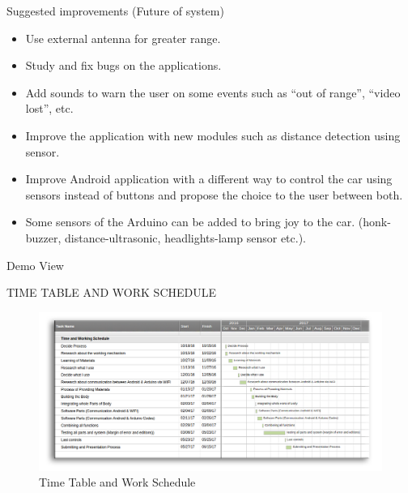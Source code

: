 \documentclass[xcolor=table, 9pt]{beamer}
\begin{document}
\begin{frame}{Suggested improvements (Future of system)}
\begin{itemize}
\item Use external antenna for greater range.
\vspace{0.1cm}
\item Study and fix bugs on the applications.
\vspace{0.1cm}
\item Add sounds to warn the user on some events such as “out of range”, “video lost”, etc.
\vspace{0.1cm}
\item Improve the application with new modules such as distance detection using sensor.
\vspace{0.1cm}
\item Improve Android application with a different way to control the car using sensors instead of buttons and propose the choice to the user between both.
\vspace{0.1cm}
\item Some sensors of the Arduino can be added to bring joy to the car. (honk-buzzer, distance-ultrasonic, headlights-lamp sensor etc.).
\end{itemize}

\end{frame}




\begin{frame}{Demo View}
\begin{center}
\end{center}
\end{frame}



\begin{frame}{TIME TABLE AND WORK SCHEDULE}
\begin{figure}
\includegraphics[width=1\linewidth]{ganttChart.png}
\caption{Time Table and Work Schedule}
\end{figure}
\end{frame}
\end{document}
